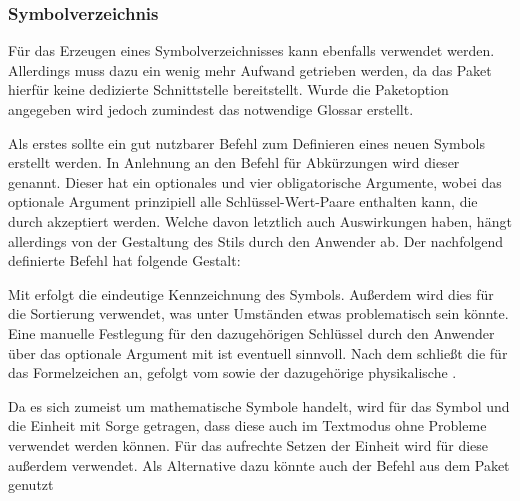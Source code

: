\documentclass[%
  english,ngerman,%
  cdgeometry=no,DIV=12,automark,%
]{tudscrartcl}
\begin{document}
\subsubsection{Symbolverzeichnis}
Für das Erzeugen eines Symbolverzeichnisses kann ebenfalls  
verwendet werden. Allerdings muss dazu ein wenig mehr Aufwand getrieben werden, 
da das Paket hierfür keine dedizierte Schnittstelle bereitstellt. Wurde die 
Paketoption  angegeben wird jedoch zumindest das notwendige 
Glossar erstellt.

Als erstes sollte ein gut nutzbarer Befehl zum Definieren eines neuen Symbols 
erstellt werden. In Anlehnung an den Befehl für Abkürzungen wird dieser 
 genannt. Dieser hat ein optionales und vier obligatorische 
Argumente, wobei das optionale Argument prinzipiell alle Schlüssel-Wert-Paare 
enthalten kann, die durch  akzeptiert werden. Welche davon 
letztlich auch Auswirkungen haben, hängt allerdings von der Gestaltung des 
Stils durch den Anwender ab. Der nachfolgend definierte Befehl hat folgende 
Gestalt:
%
\begin{quoting}[leftmargin=\parindent]
\LParameter{}%
\end{quoting}
%
Mit  erfolgt die eindeutige Kennzeichnung des Symbols. Außerdem 
wird dies für die Sortierung verwendet, was unter Umständen etwas problematisch 
sein könnte. Eine manuelle Festlegung für den dazugehörigen Schlüssel durch den 
Anwender über das optionale Argument mit  ist 
eventuell sinnvoll. Nach dem  schließt die  für 
das Formelzeichen an, gefolgt vom  sowie der dazugehörige 
physikalische .
%
\CodeHook{\let\newcommand\renewcommand}
\begin{Preamble*}
\newcommand*{\newsymbol}[5][]{%
  \newglossaryentry{#2}{%
    type=symbols,%
    description={},%
    name={#3},%
    symbol={\ensuremath{#4}},%
    user1={\ensuremath{\mathrm{#5}}},%
    sort={#2},%
    #1%
  }%
}

\end{Preamble*}
%
Da es sich zumeist um mathematische Symbole handelt, wird für das Symbol und 
die Einheit mit  Sorge getragen, dass diese auch im 
Textmodus ohne Probleme verwendet werden können. Für das aufrechte Setzen der 
Einheit wird für diese außerdem  verwendet. Als Alternative dazu 
könnte auch der Befehl  aus dem Paket  genutzt 
\end{document}
